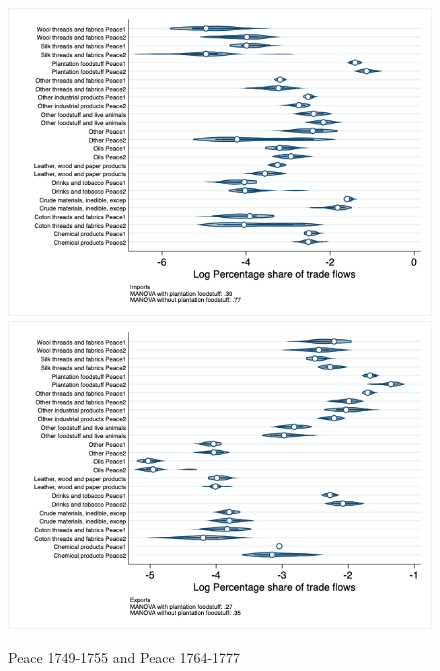 \documentclass[12pt,a4paper,notitlepage,english]{article}
\begin{document}
\begin{figure}
\centering
\caption{Peace 1749-1755 and Peace 1764-1777}
\label{seven_peace1764_1777_nat_distr}
\includegraphics[scale=.4]{peace1749_1755_peace1764_1777_nat_distr_Isitc}
\includegraphics[scale=.4]{peace1749_1755_peace1764_1777_nat_distr_Xsitc}
\end{figure}
\end{document}
